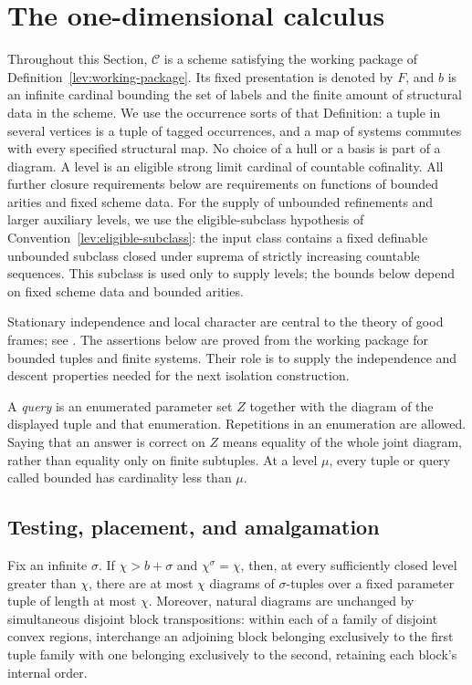 \section{The one-dimensional calculus}
\label{calc:section-calculus}

Throughout this Section, $\mathcal C$ is a scheme satisfying the working
package of Definition~\ref{lev:working-package}.  Its fixed presentation is
denoted by $F$, and $b$ is an infinite cardinal bounding the set of labels
and the finite amount of structural data in the scheme.  We use the
occurrence sorts of that Definition: a tuple in several vertices is a
tuple of tagged occurrences, and a map of systems commutes with every
specified structural map.  No choice of a hull or a basis is part of a
diagram.  A level is an eligible strong limit cardinal of countable
cofinality.  All further closure requirements below are requirements on
functions of bounded arities and fixed scheme data.
For the supply of unbounded refinements and larger auxiliary levels,
we use the eligible-subclass hypothesis of
Convention~\ref{lev:eligible-subclass}: the input class contains a fixed
definable unbounded subclass closed under suprema of strictly increasing
countable sequences.  This subclass is used only to supply levels;
the bounds below depend on fixed scheme data and bounded arities.

Stationary independence and local character are central to the theory of
good frames; see \cite[II.2.1]{Shelah2009}.  The assertions below are
proved from the working package for bounded tuples and finite systems.
Their role is to supply the independence and descent properties needed
for the next isolation construction.

A \emph{query} is an enumerated parameter set $Z$ together with the
diagram of the displayed tuple and that enumeration.  Repetitions in an
enumeration are allowed.  Saying that an answer is correct on $Z$ means
equality of the whole joint diagram, rather than equality only on finite
subtuples.  At a level $\mu$, every tuple or query called bounded has
cardinality less than $\mu$.

\subsection{Testing, placement, and amalgamation}

\begin{lemma}
\label{calc:parameter-orbits}
Fix an infinite $\sigma$.  If
$\chi>b+\sigma$ and $\chi^\sigma=\chi$, then, at every sufficiently closed
level greater than $\chi$, there are at most $\chi$ diagrams of
$\sigma$-tuples over a fixed parameter tuple of length at most $\chi$.
Moreover, natural diagrams are unchanged by simultaneous disjoint block
transpositions: within each of a family of disjoint convex regions,
interchange an adjoining block belonging exclusively to the first tuple
family with one belonging exclusively to the second, retaining each
block's internal order.
\end{lemma}

